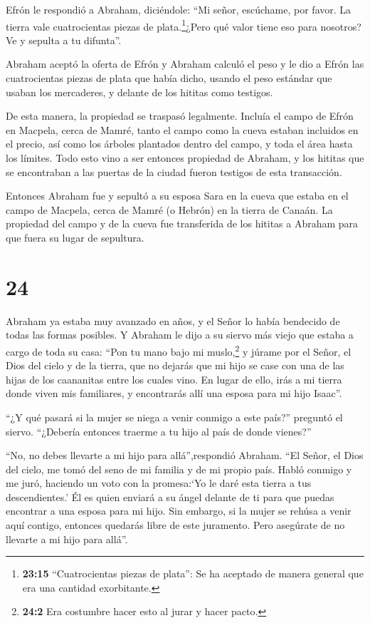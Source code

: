  Efrón le respondió a Abraham, diciéndole: 
``Mi señor, escúchame, por favor. La tierra vale cuatrocientas piezas de
plata.\footnote{\textbf{23:15} ``Cuatrocientas piezas de plata'': Se ha
  aceptado de manera general que era una cantidad exorbitante.}¿Pero qué
valor tiene eso para nosotros? Ve y sepulta a tu difunta''.

 Abraham aceptó la oferta de Efrón y Abraham calculó el
peso y le dio a Efrón las cuatrocientas piezas de plata que había dicho,
usando el peso estándar que usaban los mercaderes, y delante de los
hititas como testigos.

 De esta manera, la propiedad se traspasó legalmente.
Incluía el campo de Efrón en Macpela, cerca de Mamré, tanto el campo
como la cueva estaban incluidos en el precio, así como los árboles
plantados dentro del campo, y toda el área hasta los límites.
 Todo esto vino a ser entonces propiedad de Abraham, y los
hititas que se encontraban a las puertas de la ciudad fueron testigos de
esta transacción.

 Entonces Abraham fue y sepultó a su esposa Sara en la
cueva que estaba en el campo de Macpela, cerca de Mamré (o Hebrón) en la
tierra de Canaán.  La propiedad del campo y de la cueva fue
transferida de los hititas a Abraham para que fuera su lugar de
sepultura.

\hypertarget{section-23}{%
\section{24}\label{section-23}}

 Abraham ya estaba muy avanzado en años, y el Señor lo había
bendecido de todas las formas posibles.  Y Abraham le dijo a
su siervo más viejo que estaba a cargo de toda su casa: ``Pon tu mano
bajo mi muslo,\footnote{\textbf{24:2} Era costumbre hacer esto al jurar
  y hacer pacto.}  y júrame por el Señor, el Dios del cielo
y de la tierra, que no dejarás que mi hijo se case con una de las hijas
de los caananitas entre los cuales vino.  En lugar de ello,
irás a mi tierra donde viven mis familiares, y encontrarás allí una
esposa para mi hijo Isaac''.

 ``¿Y qué pasará si la mujer se niega a venir conmigo a este
país?'' preguntó el siervo. ``¿Debería entonces traerme a tu hijo al
país de donde vienes?''

 ``No, no debes llevarte a mi hijo para allá'',respondió
Abraham.  ``El Señor, el Dios del cielo, me tomó del seno de
mi familia y de mi propio país. Habló conmigo y me juró, haciendo un
voto con la promesa:`Yo le daré esta tierra a tus descendientes.' Él es
quien enviará a su ángel delante de ti para que puedas encontrar a una
esposa para mi hijo.  Sin embargo, si la mujer se rehúsa a
venir aquí contigo, entonces quedarás libre de este juramento. Pero
asegúrate de no llevarte a mi hijo para allá''.


